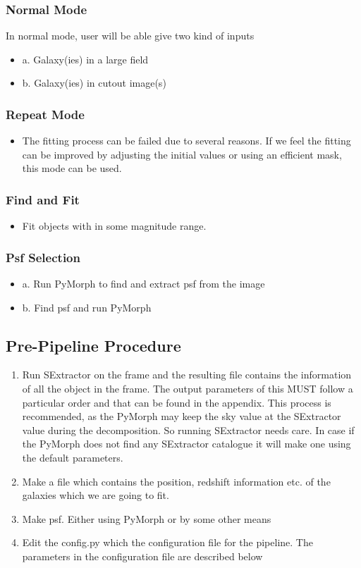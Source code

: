 \documentclass[a4paper,12pt]{article}
\begin{document}
\subsubsection{Normal Mode}
In normal mode, user will be able give two kind of inputs
\begin{itemize}
\item 
a. Galaxy(ies) in a large field
\item
b. Galaxy(ies) in cutout image(s)
\end{itemize}

\subsubsection{Repeat Mode}
\begin{itemize}
 \item 
The fitting process can be failed due to several reasons. If we feel the fitting can be improved by adjusting the initial values or using an efficient mask, this mode can be used.
\end{itemize}

\subsubsection{Find and Fit}
\begin{itemize}
\item 
Fit objects with in some magnitude range.
\end{itemize}
\subsubsection{Psf Selection}
\begin{itemize}
\item 
a. Run PyMorph to find and extract psf from the image
\item
b. Find psf and run PyMorph
\end{itemize}
\subsection{Pre-Pipeline Procedure}
\begin{enumerate}
 \item 
Run SExtractor on the frame and the resulting file contains the information of all the object in the frame. The output parameters of this MUST follow a particular order and that can be found in the appendix. This process is recommended, as the PyMorph may keep the sky value at the SExtractor value during the decomposition. So running SExtractor needs care. In case if the PyMorph does not find any SExtractor catalogue it will make one using the default parameters.
\item
Make a file which contains the position, redshift information etc. of the galaxies which we are going to fit.
\item
Make psf. Either using PyMorph or by some other means
\item
Edit the config.py which the configuration file for the pipeline. The parameters in the configuration file are described below
\end{enumerate}
\end{document}
